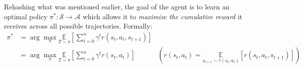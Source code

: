 \documentclass{article} %
\theoremstyle{definition}
\begin{document}
Rehashing what was mentioned earlier, the goal of the agent is to learn an optimal policy 
$\pi^{*}: \mathcal{S} \rightarrow \mathcal{A}$ which allows it to \textit{maximize the cumulative reward}
it receives across all possible trajectories.
Formally:
\begin{equation}
    \begin{array}{rll}
        \pi^{*} & = {\displaystyle \arg\max_{\pi} \underset{T \sim \pi}{\mathbb{E}} \left[ \sum_{t=0}^{n} \gamma^t r(s_t, a_t, s_{t+1}) \right]} 
                & \\
                & = {\displaystyle \arg\max_{\pi} \underset{T \sim \pi}{\mathbb{E}} \left[ \sum_{t=0}^{n} \gamma^t r(s_t, a_t) \right] } 
                & {\displaystyle \left(r(s_t, a_t) = \underset{s_{t + 1} \sim \tau(s_t, a_t)}{\mathbb{E}}[r(s_t, a_t, s_{t + 1})]\right) } \\
    \end{array}
\end{equation}



\appendix
\end{document}
